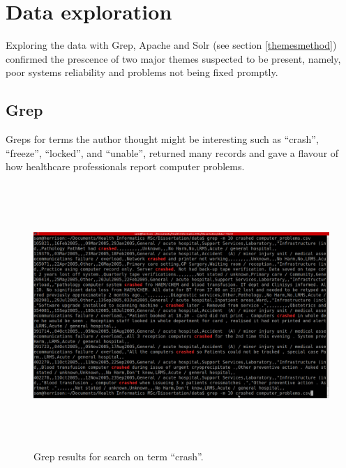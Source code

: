 \section{Data exploration}
\label{themesresults}
Exploring the data with Grep, Apache and Solr (see section \ref{themesmethod}) confirmed the prescence of two major themes suspected to be present, namely, poor systems reliability and problems not being fixed promptly. 


\subsection{Grep}

Greps for terms the author thought might be interesting such as ``crash'', ``freeze'', ``locked'', and ``unable'', returned many records and gave a flavour of how healthcare professionals report computer problems.

\begin{figure}[htp]
\centering
\includegraphics[width=15cm,height=10cm]{figs/grepcrashed10.png}
\caption{Grep results for search on term ``crash''.}\label{fig:bugsa}
\end{figure}


